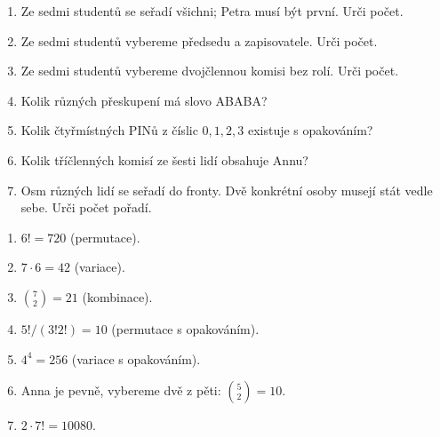 \documentclass[11pt,a4paper]{article}
\begin{document}
\begin{zadaniReseniBox}[title={Domácí úkol}]

\begin{enumerate}[label=\alph*),leftmargin=*,itemsep=2pt]

\item Ze sedmi studentů se seřadí všichni; Petra musí být první. Urči počet.
\item Ze sedmi studentů vybereme předsedu a zapisovatele. Urči počet.
\item Ze sedmi studentů vybereme dvojčlennou komisi bez rolí. Urči počet.
\item Kolik různých přeskupení má slovo ABABA?
\item Kolik čtyřmístných PINů z číslic $0,1,2,3$ existuje s opakováním?
\item Kolik tříčlenných komisí ze šesti lidí obsahuje Annu?
\item Osm různých lidí se seřadí do fronty. Dvě konkrétní osoby musejí stát vedle sebe. Urči počet pořadí.

\end{enumerate}

\tcblower

\begin{enumerate}[label=\alph*),leftmargin=*,itemsep=2pt]

\item $6!=720$ (permutace).
\item $7\cdot6=42$ (variace).
\item $\binom72=21$ (kombinace).
\item $5!/(3!2!)=10$ (permutace s opakováním).
\item $4^4=256$ (variace s opakováním).
\item Anna je pevně, vybereme dvě z pěti: $\binom52=10$.
\item $2\cdot7!=10080$.

\end{enumerate}

\end{zadaniReseniBox}


\end{document}
